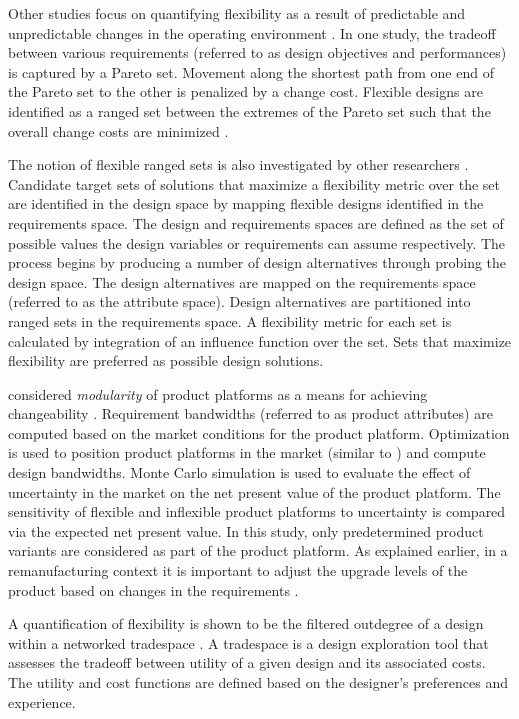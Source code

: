 Other studies focus on quantifying flexibility as a result of predictable and unpredictable changes in the operating environment \cite{Olewnik2004,Liu2008}. In one study, the tradeoff between various requirements (referred to as design objectives and performances) is captured by a Pareto set. Movement along the shortest path from one end of the Pareto set to the other is penalized by a change cost. Flexible designs are identified as a ranged set between the extremes of the Pareto set such that the overall change costs are minimized \cite{Olewnik2004}.

The notion of flexible ranged sets is also investigated by other researchers \cite{Liu2008}. Candidate target sets of solutions that maximize a flexibility metric over the set are identified in the design space by mapping flexible designs identified in the requirements space. The design and requirements spaces are defined as the set of possible values the design variables or requirements can assume respectively. The process begins by producing a number of design alternatives through probing the design space. The design alternatives are mapped on the requirements space (referred to as the attribute space). Design alternatives are partitioned into ranged sets in the requirements space. A flexibility metric for each set is calculated by integration of an influence function over the set. Sets that maximize flexibility are preferred as possible design solutions.

\citeauthor{Suh2007} considered \textit{modularity} of product platforms as a means for achieving changeability \cite{Suh2007}. Requirement bandwidths (referred to as product attributes) are computed based on the market conditions for the product platform. Optimization is used to position product platforms in the market (similar to \citeauthor{Kwak2013} \cite{Kwak2013}) and compute design bandwidths. Monte Carlo simulation is used to evaluate the effect of uncertainty in the market on the net present value of the product platform. The sensitivity of flexible and inflexible product platforms to uncertainty is compared via the expected net present value. In this study, only predetermined product variants are considered as part of the product platform. As explained earlier, in a remanufacturing context it is important to adjust the upgrade levels of the product based on changes in the requirements \cite{Kwak2013}.

A quantification of flexibility is shown to be the filtered outdegree of a design within a networked tradespace \cite{Ross2008}. A tradespace is a design exploration tool that assesses the tradeoff between utility of a given design and its associated costs. The utility and cost functions are defined based on the designer's preferences and experience.

